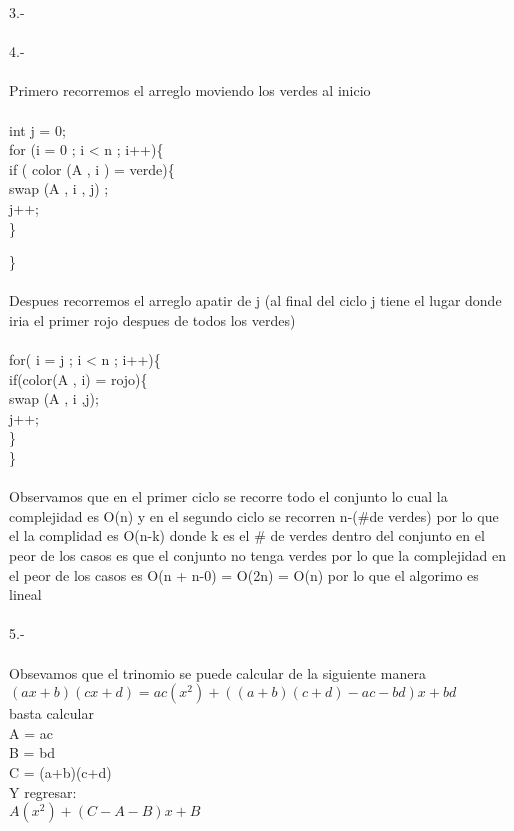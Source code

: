 \documentclass{article}
\begin{document}
\begin{flushleft}
	3.-  \\ \ \\
	4.-  \\ \ \\
	Primero recorremos el arreglo moviendo los verdes al inicio \\ \ \\
	int j = 0;\\
	for (i = 0 ; i < n ; i++)\{\\
	\hspace{0.5cm}if ( color (A , i ) = verde)\{\\
	\hspace{1cm}		swap (A , i  , j) ;\\
           \hspace{1cm}             	j++;\\
	\hspace{0.5cm}	  \}

			\}	\\ \ \\

	Despues recorremos el arreglo apatir de j (al final del ciclo j tiene el lugar donde iria el primer rojo despues de todos los verdes) \\ \ \\
	for( i = j ; i < n ; i++)\{\\
	\hspace{0.5cm}	if(color(A , i) = rojo)\{\\
	 \hspace{1cm}   		swap (A , i ,j);\\
	 \hspace{1cm}   		j++;\\
	\hspace{0.5cm}	\}\\
	\}\\	\ \\
	Observamos que en el primer ciclo se recorre todo el conjunto lo cual la complejidad es O(n) y en el segundo ciclo se recorren n-(\#de verdes) por lo que el la complidad es O(n-k) donde k 			es el \# de verdes dentro del conjunto en el peor de los casos es que el conjunto no tenga verdes por lo que la complejidad en el peor de los casos es O(n + n-0) = O(2n) = O(n) por lo que 	el algorimo es lineal\\ \ \\
	5.-  \\ \ \\
	Obsevamos que el trinomio se puede calcular de la siguiente manera \\
	$(ax+b)(cx+d) = ac(x^{2}) +((a+b)(c+d) -ac -bd)x +bd$ \\
          basta calcular \\
 	A = ac \\
 	B = bd \\
 	C = (a+b)(c+d) \\
 	Y regresar:\\
   	 $A(x^{2}) +(C-A-B)x +B$
	
	\end{flushleft}
\end{document}

